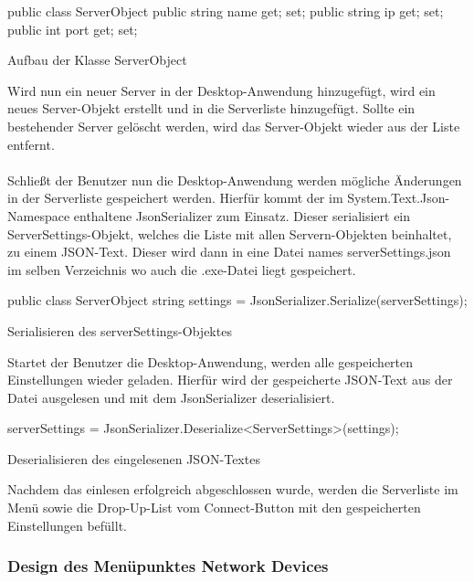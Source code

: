 \begin{program}[H]
\begin{CSharpCode}
public class ServerObject
{
    public string name { get; set; }
    public string ip { get; set; }
    public int port { get; set; }
}
\end{CSharpCode}
\caption{Aufbau der Klasse ServerObject}
\end{program}
\noindent
Wird nun ein neuer Server in der Desktop-Anwendung hinzugefügt, wird ein neues Server-Objekt erstellt und in die Serverliste hinzugefügt. Sollte ein bestehender Server gelöscht werden, wird das Server-Objekt wieder aus der Liste entfernt.
\\ \ \\
Schließt der Benutzer nun die Desktop-Anwendung werden mögliche Änderungen in der Serverliste gespeichert werden. Hierfür kommt der im System.Text.Json-Namespace enthaltene JsonSerializer zum Einsatz. Dieser serialisiert ein ServerSettings-Objekt, welches die Liste mit allen Servern-Objekten beinhaltet, zu einem JSON-Text. Dieser wird dann in eine Datei names serverSettings.json im selben Verzeichnis wo auch die .exe-Datei liegt gespeichert.

\begin{program}[H]
\begin{CSharpCode}
public class ServerObject
string settings = JsonSerializer.Serialize(serverSettings);
\end{CSharpCode}
\caption{Serialisieren des serverSettings-Objektes}
\end{program}
\noindent
Startet der Benutzer die Desktop-Anwendung, werden alle gespeicherten Einstellungen wieder geladen. Hierfür wird der gespeicherte JSON-Text aus der Datei ausgelesen und mit dem JsonSerializer deserialisiert.

\begin{program}[H]
\begin{CSharpCode}
serverSettings = JsonSerializer.Deserialize<ServerSettings>(settings);
\end{CSharpCode}
\caption{Deserialisieren des eingelesenen JSON-Textes}
\end{program}
\noindent
Nachdem das einlesen erfolgreich abgeschlossen wurde, werden die Serverliste im Menü sowie die Drop-Up-List vom Connect-Button mit den gespeicherten Einstellungen befüllt.

\subsubsection{Design des Menüpunktes Network Devices}

